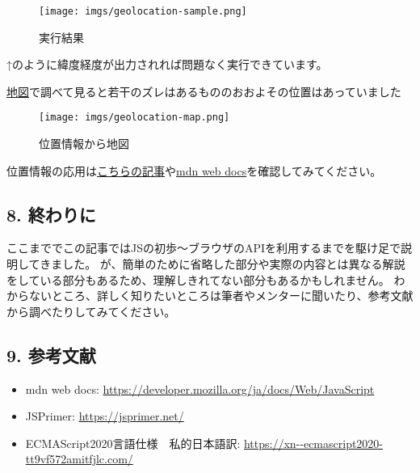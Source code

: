 \begin{figure}
\centering
\texttt{[image: imgs/geolocation-sample.png]}
\caption{実行結果}
\end{figure}

↑のように緯度経度が出力されれば問題なく実行できています。

\href{https://fukuno.jig.jp/app/map/latlng/}{地図}で調べて見ると若干のズレはあるもののおおよその位置はあっていました

\begin{figure}
\centering
\texttt{[image: imgs/geolocation-map.png]}
\caption{位置情報から地図}
\end{figure}

位置情報の応用は\href{https://hackmd.io/@haruyuki16278/Hk2Tmh7b3}{こちらの記事}や\href{https://developer.mozilla.org/ja/docs/Web/API/Geolocation_API/Using_the_Geolocation_API\#examples}{mdn
web docs}を確認してみてください。

\subsection{8. 終わりに}\label{ux7d42ux308fux308aux306b}

ここまででこの記事ではJSの初歩〜ブラウザのAPIを利用するまでを駆け足で説明してきました。
が、簡単のために省略した部分や実際の内容とは異なる解説をしている部分もあるため、理解しきれてない部分もあるかもしれません。
わからないところ、詳しく知りたいところは筆者やメンターに聞いたり、参考文献から調べたりしてみてください。

\subsection{9. 参考文献}\label{ux53c2ux8003ux6587ux732e}

\begin{itemize}
\tightlist
\item
  mdn web docs:
  \url{https://developer.mozilla.org/ja/docs/Web/JavaScript}
\item
  JSPrimer: \url{https://jsprimer.net/}
\item
  ECMAScript2020言語仕様　私的日本語訳:
  \url{https://xn--ecmascript2020-tt9vf572amitfjlc.com/}
\end{itemize}
